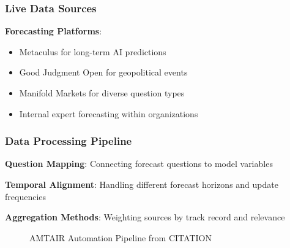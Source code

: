 \documentclass[
  11pt,
  letterpaper,
]{book}
\providecommand{\tightlist}{%
  \setlength{\itemsep}{0pt}\setlength{\parskip}{0pt}}
\begin{document}
\subsubsection{Live Data Sources}\label{sec-live-data}

\textbf{Forecasting Platforms}:

\begin{itemize}
\tightlist
\item
  Metaculus for long-term AI predictions
\item
  Good Judgment Open for geopolitical events
\item
  Manifold Markets for diverse question types
\item
  Internal expert forecasting within organizations
\end{itemize}

\subsubsection{Data Processing Pipeline}\label{sec-data-processing}

\textbf{Question Mapping}: Connecting forecast questions to model
variables

\textbf{Temporal Alignment}: Handling different forecast horizons and
update frequencies

\textbf{Aggregation Methods}: Weighting sources by track record and
relevance

\begin{figure}


\caption[Five-step AMTAIR automation pipeline from PDFs to Bayesian
networks]{\label{fig-automation_pipeline}AMTAIR Automation Pipeline from
CITATION}

\end{figure}%
\end{document}
